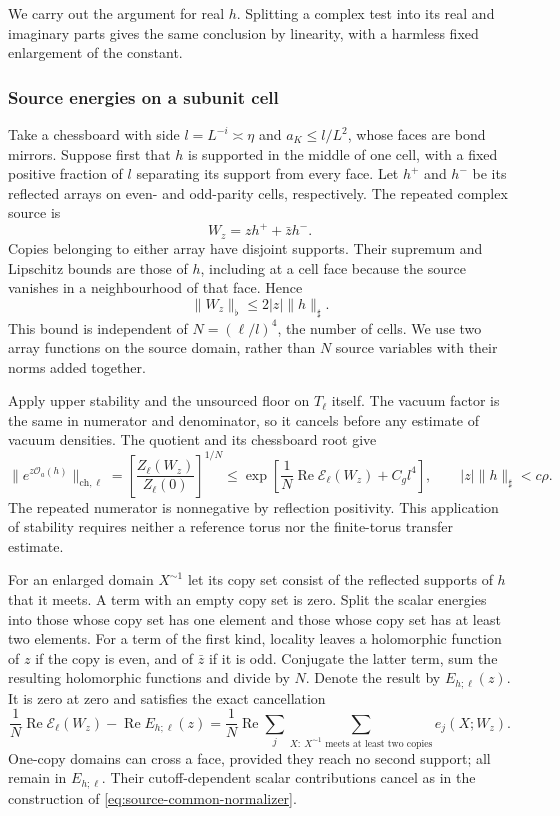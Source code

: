 \documentclass[11pt,letterpaper,reqno]{amsart}
\theoremstyle{definition}
\theoremstyle{remark}
\newcommand{\cO}{\mathcal O}
\begin{document}
We carry out the argument for real $h$. Splitting a complex test into
its real and imaginary parts gives the same conclusion by linearity,
with a harmless fixed enlargement of the constant.

\subsubsection{Source energies on a subunit cell}

Take a chessboard with side $l=L^{-i}\asymp\eta$ and
$a_K\le l/L^2$, whose faces are bond mirrors. Suppose first that
$h$ is supported in the middle of one cell, with a fixed positive
fraction of $l$ separating its support from every face. Let $h^+$
and $h^-$ be its reflected arrays on even- and odd-parity cells,
respectively. The repeated complex source is
\[
 W_z=zh^++\bar z h^-.
\]
Copies belonging to either array have disjoint supports. Their
supremum and Lipschitz bounds are those of $h$, including at a
cell face because the source vanishes in a neighbourhood of that
face. Hence
\[
 \|W_z\|_\flat\le2|z|\|h\|_\sharp.
\]
This bound is independent of $N=(\ell/l)^4$, the number of
cells. We use two array functions on the source domain, rather than
$N$ source variables with their norms added together.

Apply upper stability and the unsourced floor on $T_\ell$
itself. The vacuum factor is the same in numerator and denominator,
so it cancels before any estimate of vacuum densities. The quotient
and its chessboard root give
\[
 \|e^{z\cO_a(h)}\|_{\mathrm{ch},\ell}
  =\left[\frac{Z_\ell(W_z)}{Z_\ell(0)}\right]^{1/N}
  \le\exp\left[
       \frac1N\operatorname{Re}\mathcal E_\ell(W_z)+C_gl^4
           \right],
 \qquad |z|\|h\|_\sharp<c\rho.
\]
The repeated numerator is nonnegative by reflection positivity.
This application of stability requires neither a reference torus
nor the finite-torus transfer estimate.

For an enlarged domain $X^{\sim1}$ let its copy set consist of
the reflected supports of $h$ that it meets. A term with an empty
copy set is zero. Split the scalar energies into those whose copy
set has one element and those whose copy set has at least two
elements. For a term of the first kind, locality leaves a
holomorphic function of $z$ if the copy is even, and of $\bar z$
if it is odd. Conjugate the latter term, sum the resulting
holomorphic functions and divide by $N$. Denote the result by
$E_{h;\ell}(z)$. It is zero at zero and satisfies the exact
cancellation
\[
 \frac1N\operatorname{Re}\mathcal E_\ell(W_z)
                     -\operatorname{Re}E_{h;\ell}(z)
   =\frac1N\operatorname{Re}
       \sum_j\sum_{X:\ X^{\sim1}\text{ meets at least two copies}}
                                                    e_j(X;W_z).
\]
One-copy domains can cross a face, provided they reach no second
support; all remain in $E_{h;\ell}$. Their cutoff-dependent scalar
contributions cancel as in the construction of
\eqref{eq:source-common-normalizer}.
\end{document}
